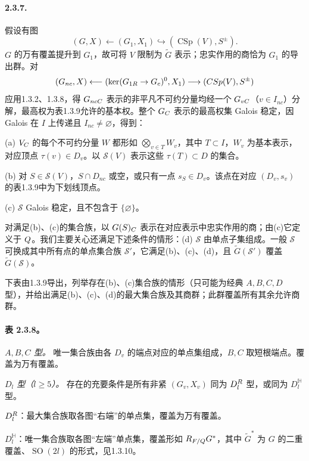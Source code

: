 \paragraph*{2.3.7.} 假设有图
\begin{equation}
 (G,X)\longleftarrow(G_1,X_1)\hookrightarrow(\operatorname{CSp}(V),S^\pm).
 \tag{2.3.7.1}
\end{equation}
$G$ 的万有覆盖提升到 $G_1$，故可将 $V$ 限制为 $\widetilde G$ 表示；忠实作用的商恰为 $G_1$ 的导出群。对
\[
 (G_{nc},X)\longleftarrow(\ker(G_{1R}\to G_c)^0,X_1)
 \longrightarrow(CSp(V),S^\pm)
\]
应用1.3.2、1.3.8，得 $G_{ncC}$ 表示的非平凡不可约分量均经一个 $G_{vC}$（$v\in I_{nc}$）分解，最高权为表1.3.9允许的基本权。整个 $G_{C}$ 表示的最高权集 Galois 稳定，因 Galois 在 $I$ 上传递且 $I_{nc}\ne\varnothing$，得到：

(a) $V_{C}$ 的每个不可约分量 $W$ 都形如 $\bigotimes_{v\in T}W_v$，其中 $T\subset I$，$W_v$ 为基本表示，对应顶点 $\tau(v)\in D_v$。以 $\mathcal S(V)$ 表示这些 $\tau(T)\subset D$ 的集合。

(b) 对 $S\in\mathcal S(V)$，$S\cap D_{nc}$ 或空，或只有一点 $s_S\in D_v$。该点在对应 $(D_v,s_v)$ 的表1.3.9中为下划线顶点。

(c) $\mathcal S$ Galois 稳定，且不包含于 $\{\varnothing\}$。

对满足(b)、(c)的集合族，以 $G(S)_{C}$ 表示在对应表示中忠实作用的商；由(c)它定义于 $Q$。我们主要关心还满足下述条件的情形：(d) $\mathcal S$ 由单点子集组成。一般 $\mathcal S$ 可换成其中所有点的单点集合族 $\mathcal S'$，它满足(b)、(c)、(d)，且 $\widetilde G(\mathcal S')$ 覆盖 $\widetilde G(\mathcal S)$。

下表由1.3.9导出，列举存在(b)、(c)集合族的情形（只可能为经典 $A,B,C,D$ 型），并给出满足(b)、(c)、(d)的最大集合族及其商群；此群覆盖所有其余允许商群。
\paragraph*{表 2.3.8。}
\emph{$A,B,C$ 型。} 唯一集合族由各 $D_v$ 的端点对应的单点集组成，$B,C$ 取短根端点。覆盖为万有覆盖。

\emph{$D_l$ 型（$l\ge5$）。} 存在的充要条件是所有非紧 $(G_v,X_v)$ 同为 $D_l^{R}$ 型，或同为 $D_l^{\mathbb H}$ 型。

$D_l^{R}$：最大集合族取各图“右端”的单点集，覆盖为万有覆盖。

$D_l^{\mathbb H}$：唯一集合族取各图“左端”单点集，覆盖形如 $R_{F/Q}G^*$，其中 $\widetilde G^*$ 为 $G$ 的二重覆盖、$\operatorname{SO}(2l)$ 的形式，见1.3.10。

